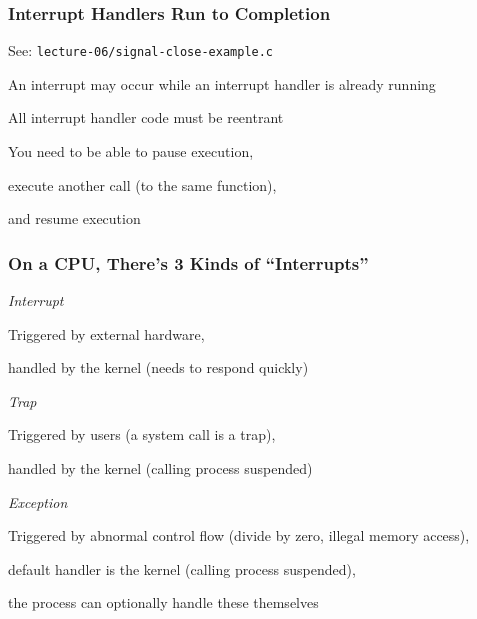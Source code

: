   \begin{frame}
    \frametitle{Interrupt Handlers Run to Completion}

    See: \texttt{lecture-06/signal-close-example.c}

    \vspace{2em}

    An interrupt may occur while an interrupt handler is already running

    \vspace{2em}

    All interrupt handler code must be reentrant

    \hspace{2em} You need to be able to pause execution,
    
    \hspace{2em} execute another call (to the same function),
    
    \hspace{2em} and resume execution
  \end{frame}

  \begin{frame}
    \frametitle{On a CPU, There's 3 Kinds of ``Interrupts''}

    \textit{Interrupt}

    \hspace{2em} Triggered by external hardware,
    
    \hspace{2em} handled by the kernel (needs to respond quickly)

    \vspace{2em}

    \textit{Trap}

    \hspace{2em} Triggered by users (a system call is a trap),
    
    \hspace{2em} handled by the kernel (calling process suspended)

    \vspace{2em}

    \textit{Exception}

    \hspace{2em} Triggered by abnormal control flow (divide by zero, illegal memory access),

    \hspace{2em} default handler is the kernel (calling process suspended),

    \hspace{2em} the process can optionally handle these themselves
  \end{frame}

